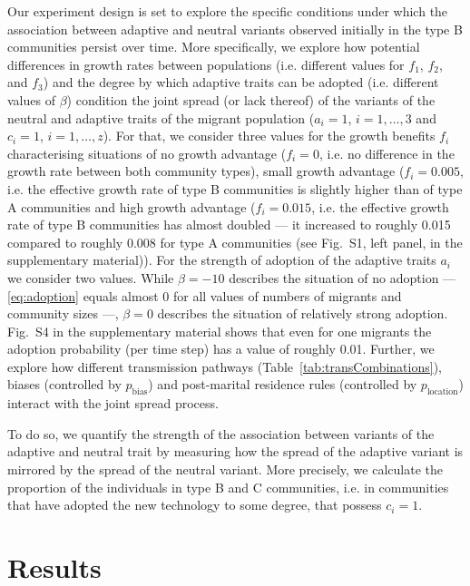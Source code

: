 \documentclass[9pt,twocolumn,twoside,lineno]{pnas-new}
\begin{document}
Our experiment design is set to explore the specific conditions under which the association between adaptive and neutral variants observed initially in the type B communities persist over time. 
More specifically, we explore how potential differences in growth rates between populations (i.e. different values for $f_1$, $f_2$, and $f_3$) and the degree by which adaptive traits can be adopted (i.e. different values of $\beta$) condition the joint spread (or lack thereof) of the variants of the neutral and adaptive traits of the migrant population ($a_i=1$, $i=1,\ldots,3$ and $c_i=1$, $i=1,\ldots,z$). 
For that, we consider three values for the growth benefits $f_i$ characterising situations of no growth advantage ($f_i=0$, i.e. no difference in the growth rate between both community types), small growth advantage ($f_i=0.005$, i.e. the effective growth rate of type B communities is slightly higher than of type A communities and high growth advantage ($f_i=0.015$, i.e. the effective growth rate of type B communities has almost doubled --- it increased to roughly 0.015 compared to roughly 0.008 for type A communities  (see Fig.~S1, left panel, in the supplementary material)). For the strength of adoption of the adaptive traits $a_i$ we consider two values. While $\beta=-10$ describes the situation of no adoption --- \eqref{eq:adoption} equals almost 0 for all values of numbers of migrants and community sizes ---, $\beta=0$ describes the situation of relatively strong adoption. Fig.~S4 in the supplementary material shows that even for one migrants the adoption probability (per time step) has a value of roughly 0.01.   
Further, we explore  how different transmission pathways (Table~\ref{tab:transCombinations}), biases (controlled by $p_\text{bias}$) and post-marital residence rules (controlled by $p_\text{location}$) interact with the joint spread process.

To do so, we quantify the strength of the association between variants of the adaptive and neutral trait by measuring how the spread of the adaptive variant is mirrored by the spread of the neutral variant. More precisely, we calculate %
the proportion of the individuals in type B and C communities, i.e. in communities that have adopted the new technology to some degree, that possess $c_i=1$. 

\section*{Results}
\end{document}
